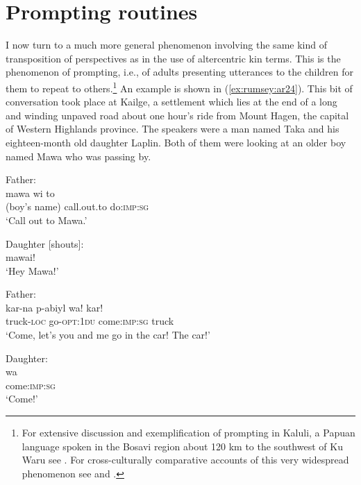 \documentclass[output=paper]{langsci/langscibook}
\begin{document}
\section{Prompting routines}\label{s:ar5}

I now turn to a much more general phenomenon involving the same kind of transposition of perspectives as in the use of altercentric kin terms. This is the phenomenon of prompting, i.e., of adults presenting utterances to the children for them to repeat to others.\footnote{For extensive discussion and exemplification of prompting in Kaluli, a Papuan language spoken in the Bosavi region about 120 km to the southwest of Ku Waru see \cite{Schieffelin1990}. For cross-culturally comparative accounts of this very widespread phenomenon see \cite{Demuth1986} and \cite{Moore2012}.} An example is shown in (\ref{ex:rumsey:ar24}). This bit of conversation took place at Kailge, a settlement which lies at the end of a long and winding unpaved road about one hour’s ride from Mount Hagen, the capital of Western Highlands province. The speakers were a man named Taka and his eighteen-month old daughter Laplin. Both of them were looking at an older boy named Mawa who was passing by.

\begin{exe}
	\ex \label{ex:rumsey:ar24}
	\begin{xlist}
	\ex Father:\label{ex:rumsey:ar24a}\\
	\gll mawa wi to\\
	{(boy’s name)} call.out.to do:\textsc{imp}:\textsc{sg}\\
	\trans ‘Call out to Mawa.’ 	
	
	\ex Daughter [shouts]:\label{ex:rumsey:ar24b}\\
	mawai!\\
	\trans ‘Hey Mawa!’
	
	\ex Father:\label{ex:rumsey:ar24c}\\
	\gll kar-na p-abiyl wa! kar!\\
	truck-\textsc{loc} go-\textsc{opt:1du} come:\textsc{imp:sg} truck\\
	\trans ‘Come, let’s you and me go in the car! The car!’
	
	\ex Daughter:\label{ex:rumsey:ar24d}\\
	\gll wa\\
	come:\textsc{imp}:\textsc{sg}\\
	\trans ‘Come!’
	\end{xlist}
\end{exe}
\end{document}
